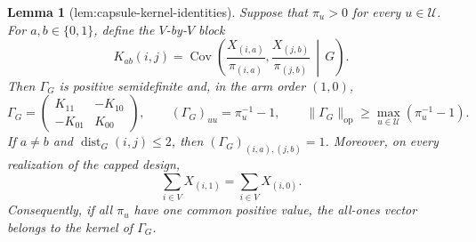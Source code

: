 \documentclass{article}
\newtheorem{lemma}{Lemma}
\begin{document}
\begin{lemma}[lem:capsule-kernel-identities]\label{lem:capsule-kernel-identities}
Suppose that \(\pi_u>0\) for every \(u\in\mathcal U\).  For \(a,b\in\{0,1\}\), define the \(V\)-by-\(V\) block
\[
K_{ab}(i,j)=\operatorname{Cov}\!\left(
 \frac{X_{(i,a)}}{\pi_{(i,a)}},
 \frac{X_{(j,b)}}{\pi_{(j,b)}}\,\middle|\,G\right).
\]
Then \(\Gamma_G\) is positive semidefinite and, in the arm order \((1,0)\),
\[
\Gamma_G=
\begin{pmatrix}
K_{11}&-K_{10}\\
-K_{01}&K_{00}
\end{pmatrix},
\qquad
(\Gamma_G)_{uu}=\pi_u^{-1}-1,
\qquad
\|\Gamma_G\|_{\mathrm{op}}
 \ge \max_{u\in\mathcal U}(\pi_u^{-1}-1).
\]
If \(a\ne b\) and \(\operatorname{dist}_G(i,j)\le2\), then
\((\Gamma_G)_{(i,a),(j,b)}=1\).  Moreover, on every realization of the capped design,
\[
\sum_{i\in V}X_{(i,1)}=\sum_{i\in V}X_{(i,0)}.
\]
Consequently, if all \(\pi_u\) have one common positive value, the all-ones vector belongs to the kernel of \(\Gamma_G\).
\end{lemma}
\end{document}
